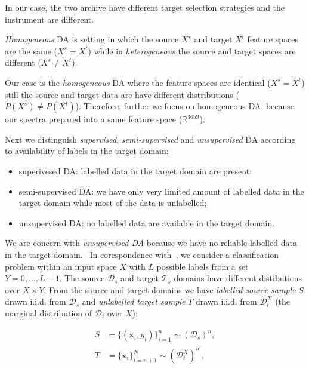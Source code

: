In our case, the two archive have different target selection strategies
and the instrument are different.

\begin{definition}
	\textit{Homogeneous} DA is setting in which the source \(X^s\)
	and target \(X^t\) feature spaces are the same
	(\(X^s = X^t\))
	while in \textit{heterogeneous} the source and target spaces are different
	(\(X^s \ne X^t\)).~\cite{csurka2017}
\end{definition}

Our case is the \textit{homogeneous} DA where the feature spaces are identical
(\(X^s = X^t\))
still the source and target data are have different distributions
(\(P(X^s) \ne P(X^t)\)).
Therefore, further we focus on homogeneous DA.
because our spectra prepared into a same feature space (\(\mathbb{R}^{3659}\)).

Next we distinguish \textit{supervised}, \textit{semi-supervised}
and \textit{unsupervised} DA
according to availability of labels in the target domain:

\begin{itemize}
	\item superivesed DA: labelled data in the target domain are present;
	\item semi-supervised DA: we have only very limited amount of labelled data in the target domain while most of the data is unlabelled;
	\item unsupervised DA: no labelled data are available in the target domain.
\end{itemize}

We are concern with \textit{unsupervised DA} because we have
no reliable labelled data in the target domain.~\cite{wang2018}
In corespondence with~\cite{ganin2016},
we consider a classification problem within an input space \(X\)
with \(L\) possible labels from a set \(Y = {0, \dots, L - 1}\).
The source \(\mathcal{D}_s\) and target \(\mathcal{T}_s\) domains
have different distibutions over \(X \times Y\).
From the source and target domains
we have \textit{labelled source sample} \(S\) drawn i.i.d. from \(\mathcal{D}_s\)
and \textit{unlabelled target sample} \(T\) drawn i.i.d. from \(\mathcal{D}^X_t\) 
(the marginal distribution of \(\mathcal{D}_t\) over \(X\)):

\begin{align}
	S &= \{(\mathbf{x}_i, y_i)\}^n_{i = 1} \sim (\mathcal{D}_s)^n, \\
	T &= \{\mathbf{x}_i\}^N_{i = n + 1} \sim (\mathcal{D}^X_t)^{n'},
\end{align}

